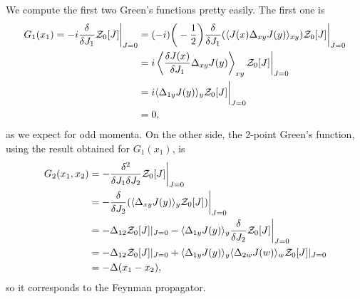 \begin{ex}
    We compute the first two Green's functions pretty easily. The first one is 
    \begin{equation}
        \begin{split}
            G_1(x_1) = -i\frac{\delta}{\delta J_1}\mathcal{Z}_0[J]\bigg|_{J = 0} &= (-i)\bigg(-\frac{1}{2}\bigg)\frac{\delta}{\delta J_1}(\langle J(x)\Delta_{xy}J(y) \rangle_{xy})\mathcal{Z}_0[J]\bigg|_{J = 0} \\
            &= i\left\langle \frac{\delta J(x)}{\delta J_1}\Delta_{xy}J(y) \right\rangle_{xy}\mathcal{Z}_0[J]\bigg|_{J = 0} \\
            &= i\langle \Delta_{1y}J(y) \rangle_{y}\mathcal{Z}_0[J]\bigg|_{J = 0} \\
            &= 0,
        \end{split}
    \end{equation}
    as we expect for odd momenta. On the other side, the 2-point Green's function, using the result obtained for $G_1(x_1)$, is 
    \begin{equation}
        \begin{split}
            G_2(x_1,x_2) &= -\frac{\delta^2}{\delta J_1\delta J_2}\mathcal{Z}_0[J]\bigg|_{J = 0} \\
            &= -\frac{\delta}{\delta J_2}(\langle \Delta_{xy}J(y) \rangle_y\mathcal{Z}_0[J])\bigg|_{J = 0} \\
            &= -\Delta_{12}\mathcal{Z}_0[J]|_{J = 0} - \langle \Delta_{1y}J(y) \rangle_{y}\frac{\delta}{\delta J_2}\mathcal{Z}_0[J]\bigg|_{J = 0} \\
            &= -\Delta_{12}\mathcal{Z}_0[J]|_{J = 0} + \langle \Delta_{1y}J(y) \rangle_{y}\langle \Delta_{2w}J(w) \rangle_{w}\mathcal{Z}_0[J]|_{J = 0} \\
            &= -\Delta(x_1 - x_2),
        \end{split}
    \end{equation}
    so it corresponds to the Feynman propagator. 
\end{ex}

